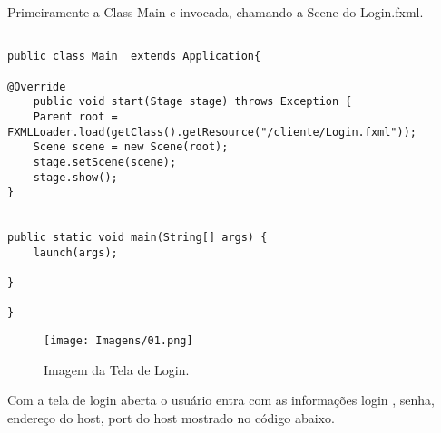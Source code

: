 \documentclass[12pt]{article}
\begin{document}
Primeiramente a Class Main e invocada, chamando a Scene do Login.fxml.

\begin{lstlisting}

public class Main  extends Application{

@Override
	public void start(Stage stage) throws Exception {
	Parent root = FXMLLoader.load(getClass().getResource("/cliente/Login.fxml"));
	Scene scene = new Scene(root);
	stage.setScene(scene);
	stage.show();
}


public static void main(String[] args) {
	launch(args);

}

}

\end{lstlisting}

\begin{figure}[H]
	\centering
	\texttt{[image: Imagens/01.png]}
	\caption{ Imagem da Tela de Login.}
	\label{fig:01}
\end{figure}

Com a tela de login aberta o usuário entra com as informações login , senha, endereço do host, port do host mostrado no código abaixo.
\end{document}
